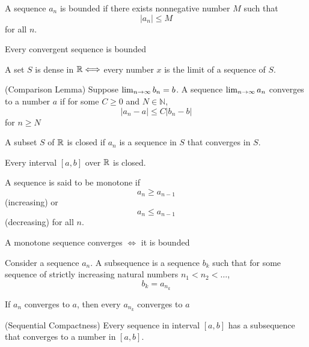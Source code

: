 \documentclass{article}
\begin{document}
\begin{definition}
    A sequence ${a_n}$ is bounded if there exists nonnegative number $M$ such that
    \[ |a_n| \leq M \]
    for all $n$.
\end{definition}

\begin{theorem}
    Every convergent sequence is bounded
\end{theorem}

\begin{theorem}
    A set $S$ is dense in $\mathbb{R}\Longleftrightarrow $ every number $x$ is the limit of a sequence of $S$.
\end{theorem}

\begin{theorem}
    (Comparison Lemma) Suppose $\lim_{n \to \infty} b_n = b$. A sequence $\lim_{n \to \infty} a_n$ converges to a number $a$
    if for some $C\geq 0$ and $N\in \mathbb{N}$,
    \[ |a_n -a| \leq C|b_n -b| \] for $n\geq N$
\end{theorem}

\begin{definition}
    A subset $S$ of $\mathbb{R}$ is closed if ${a_n}$ is a sequence in $S$ that converges in $S$.
\end{definition}

\begin{theorem}
    Every interval $[a,b]$ over $\mathbb{R}$ is closed.
\end{theorem}

\begin{definition}
    A sequence is said to be monotone if
    \[ a_n \geq a_{n-1} \]
    (increasing) or
    \[ a_n \leq a_{n-1} \]
    (decreasing) for all $n$.
\end{definition}

\begin{theorem}
    A monotone sequence converges $\iff$ it is bounded
\end{theorem}

\begin{definition}
    Consider a sequence ${a_n}$. A subsequence is a sequence $b_k$ such that for some
    sequence of strictly increasing natural numbers $n_1 < n_2 < \hdots $,
    \[ b_k = a_{n_k} \]
\end{definition}

\begin{theorem}
    If ${a_n}$ converges to $a$, then every ${a_{n_k}}$ converges to $a$    
\end{theorem}

\begin{theorem}
    (Sequential Compactness)
    Every sequence in interval $[a,b]$ has a subsequence that converges to a number
    in $[a,b]$.
\end{theorem}
\end{document}
